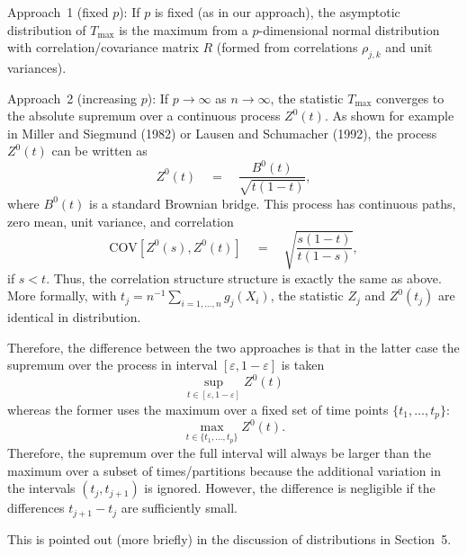 \documentclass[11pt,a4paper]{article}
\begin{document}
\begin{enumerate}
	Approach~1 (fixed $p$): If $p$ is fixed (as in our approach), the asymptotic
	distribution of $T_{\max}$ is the maximum from a $p$-dimensional normal
	distribution with correlation/covariance matrix $R$ (formed from correlations
	$\rho_{j, k}$ and unit variances).
	
	Approach~2 (increasing $p$): If $p \rightarrow \infty$ as $n \rightarrow \infty$,
	the statistic $T_{\max}$ converges to the absolute supremum over a continuous process
	$Z^0(t)$. As shown for example in Miller and Siegmund (1982) or
	Lausen and Schumacher (1992), the process $Z^0(t)$ can be written as
	  \[ Z^0(t) \quad = \quad \frac{B^0(t)}{\sqrt{t (1 - t)}}, \]
	where $B^0(t)$ is a standard Brownian bridge. This process has continuous paths,
	zero mean, unit variance, and correlation
	  \[ \mbox{COV}[Z^0(s), Z^0(t)] \quad = \quad \sqrt{\frac{s (1 - t)}{t (1 - s)}}, \]
	if $s < t$. Thus, the correlation structure structure is exactly the same as
	above. More formally, with $t_j = n^{-1} \sum_{i = 1, \dots, n} g_j(X_i)$,
	the statistic $Z_j$ and $Z^0(t_j)$ are identical in distribution.
	
	Therefore, the difference between the two approaches is that in the latter case
	the supremum over the process in interval $[\varepsilon, 1 - \varepsilon]$ is taken
	  \[ \sup_{t \in [\varepsilon, 1 - \varepsilon]} Z^0(t) \]
	whereas the former uses the maximum over a fixed set of time points
	$\{t_1, \dots, t_p\}$:	
	  \[ \max_{t \in \{t_1, \dots, t_p\}} Z^0(t). \]
	Therefore, the supremum over the full interval will always be larger than the 
	maximum over a subset of times/partitions because the additional variation
	in the intervals $(t_j, t_{j + 1})$ is ignored. However, the difference is negligible
	if the differences $t_{j+1} - t_j$ are sufficiently small.
	
	This is pointed out (more briefly) in the discussion of distributions in Section~5.
		

\end{enumerate}
\end{document}
